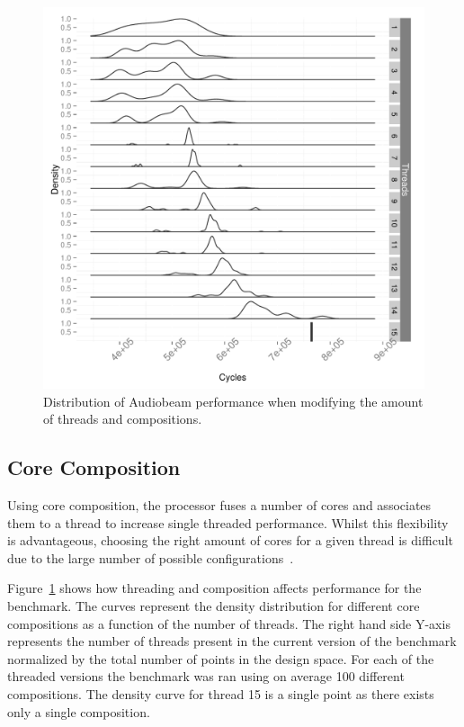 \begin{figure}[h]
  \includegraphics[width=1\textwidth]{streamit-paper/graphics/audiobeam_tots.pdf}
  \caption{Distribution of Audiobeam performance when modifying the amount of threads and compositions.}\label{fig:audiototal}
\end{figure}

\subsection{Core Composition}

Using core composition, the processor fuses a number of cores and associates them to a thread to increase single threaded performance.
Whilst this flexibility is advantageous, choosing the right amount of cores for a given thread is difficult due to the large number of possible configurations~\cite{gulati2008multitaskingdmc}.

Figure~\ref{fig:audiototal} shows how threading and composition affects performance for the  benchmark.
The curves represent the density distribution for different core compositions as a function of the number of threads.
The right hand side Y-axis represents the number of threads present in the current version of the benchmark normalized by the total number of points in the design space.
For each of the threaded versions the benchmark was ran using on average 100 different compositions.
The density curve for thread 15 is a single point as there exists only a single composition.

